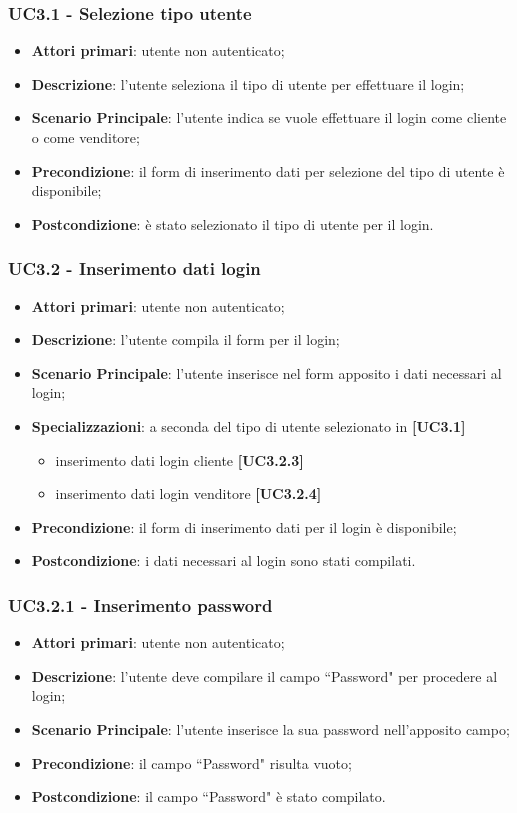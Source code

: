 \subsubsection{UC3.1 - Selezione tipo utente}
\begin{itemize}
\item \textbf{Attori primari}: utente non autenticato;
\item \textbf{Descrizione}: l'utente seleziona il tipo di utente per effettuare il login;
\item \textbf{Scenario Principale}: l'utente indica se vuole effettuare il login come cliente o come venditore;
\item \textbf{Precondizione}: il form di inserimento dati per selezione del tipo di utente è disponibile;
\item \textbf{Postcondizione}: è stato selezionato il tipo di utente per il login.
\end{itemize}

\subsubsection{UC3.2 - Inserimento dati login}
\begin{itemize}
\item \textbf{Attori primari}: utente non autenticato;
\item \textbf{Descrizione}: l'utente compila il form per il login;
\item \textbf{Scenario Principale}: l'utente inserisce nel form apposito i dati necessari al login;
\item \textbf{Specializzazioni}: a seconda del tipo di utente selezionato in \textbf{[UC3.1]}
\begin{itemize}
	\item inserimento dati login cliente \textbf{[UC3.2.3]}
	\item inserimento dati login venditore \textbf{[UC3.2.4]}
\end{itemize}
\item \textbf{Precondizione}: il form di inserimento dati per il login è disponibile;
\item \textbf{Postcondizione}: i dati necessari al login sono stati compilati.
\end{itemize}

\subsubsection{UC3.2.1 - Inserimento password}
\begin{itemize}
\item \textbf{Attori primari}: utente non autenticato;
\item \textbf{Descrizione}: l'utente deve compilare il campo ``Password" per procedere al login;
\item \textbf{Scenario Principale}: l'utente inserisce la sua password nell'apposito campo;
\item \textbf{Precondizione}: il campo ``Password" risulta vuoto;
\item \textbf{Postcondizione}: il campo ``Password" è stato compilato.
\end{itemize}

